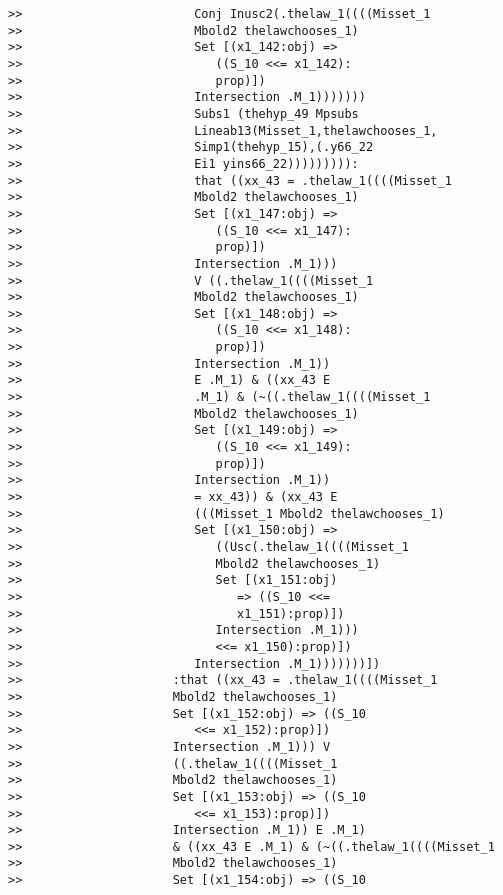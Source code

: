 \documentclass[12pt]{article}
\begin{document}
\begin{verbatim}
>>                        Conj Inusc2(.thelaw_1((((Misset_1
>>                        Mbold2 thelawchooses_1)
>>                        Set [(x1_142:obj) =>
>>                           ((S_10 <<= x1_142):
>>                           prop)])
>>                        Intersection .M_1)))))))
>>                        Subs1 (thehyp_49 Mpsubs
>>                        Lineab13(Misset_1,thelawchooses_1,
>>                        Simp1(thehyp_15),(.y66_22
>>                        Ei1 yins66_22))))))))):
>>                        that ((xx_43 = .thelaw_1((((Misset_1
>>                        Mbold2 thelawchooses_1)
>>                        Set [(x1_147:obj) =>
>>                           ((S_10 <<= x1_147):
>>                           prop)])
>>                        Intersection .M_1)))
>>                        V ((.thelaw_1((((Misset_1
>>                        Mbold2 thelawchooses_1)
>>                        Set [(x1_148:obj) =>
>>                           ((S_10 <<= x1_148):
>>                           prop)])
>>                        Intersection .M_1))
>>                        E .M_1) & ((xx_43 E
>>                        .M_1) & (~((.thelaw_1((((Misset_1
>>                        Mbold2 thelawchooses_1)
>>                        Set [(x1_149:obj) =>
>>                           ((S_10 <<= x1_149):
>>                           prop)])
>>                        Intersection .M_1))
>>                        = xx_43)) & (xx_43 E
>>                        (((Misset_1 Mbold2 thelawchooses_1)
>>                        Set [(x1_150:obj) =>
>>                           ((Usc(.thelaw_1((((Misset_1
>>                           Mbold2 thelawchooses_1)
>>                           Set [(x1_151:obj)
>>                              => ((S_10 <<=
>>                              x1_151):prop)])
>>                           Intersection .M_1)))
>>                           <<= x1_150):prop)])
>>                        Intersection .M_1)))))))])
>>                     :that ((xx_43 = .thelaw_1((((Misset_1
>>                     Mbold2 thelawchooses_1)
>>                     Set [(x1_152:obj) => ((S_10
>>                        <<= x1_152):prop)])
>>                     Intersection .M_1))) V
>>                     ((.thelaw_1((((Misset_1
>>                     Mbold2 thelawchooses_1)
>>                     Set [(x1_153:obj) => ((S_10
>>                        <<= x1_153):prop)])
>>                     Intersection .M_1)) E .M_1)
>>                     & ((xx_43 E .M_1) & (~((.thelaw_1((((Misset_1
>>                     Mbold2 thelawchooses_1)
>>                     Set [(x1_154:obj) => ((S_10

\end{verbatim}
\end{document}
